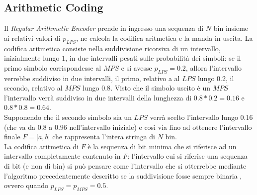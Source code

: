 \subsection{Arithmetic Coding}
Il \emph{Regular Arithmetic Encoder} prende in ingresso una sequenza di $N$ bin
insieme ai relativi valori di $p_{LPS}$, ne calcola la codifica aritmetica e la 
manda in uscita. La codifica aritmetica consiste nella suddivisione ricorsiva
di un intervallo, inizialmente lungo $1$, in due intervalli pesati sulle 
probabilità dei simboli: se il primo simbolo corrispondesse al $MPS$ e si 
avesse $p_{LPS}=0.2$, allora l'intervallo verrebbe suddiviso in due intervalli,
il primo, relativo a al $LPS$ lungo $0.2$, il secondo, relativo al $MPS$ lungo
$0.8$. Visto che il simbolo uscito è un $MPS$ l'intervallo verrà suddiviso in
due intervalli della lunghezza di $0.8*0.2=0.16$ e $0.8*0.8= 0.64$. \\
Supponendo che il secondo simbolo sia un $LPS$ verrà scelto l'intervallo lungo
0.16 (che va da $0.8$ a $0.96$ nell'intervallo iniziale) e così via fino ad
ottenere l'intervallo finale $F={[a,b[}$ che rappresenta l'intera stringa di
$N$ bin. \\
La codifica aritmetica di $F$ è la sequenza di bit minima che si riferisce ad un
intervallo completamente contenuto in $F$: l'intervallo cui si riferisc una
sequenza di bit (e non di bin) si può pensare come l'intervallo che si
otterrebbe mediante l'algoritmo precedentemente descritto se la suddivisione
fosse sempre binaria , ovvero quando $p_{LPS} = p_{MPS} = 0.5$.
